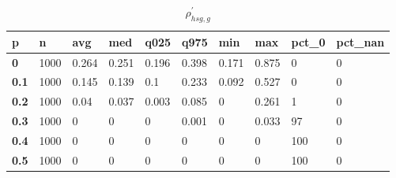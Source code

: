 \begin{table}[h]
 \centering 
\footnotesize
\caption{$\rho_{hsg,g}^\prime $}
\label{tab:alphahsgg}
\begin{tabular}[h]{|l|l|l|l|l|l|l|l|l|l|
    } \hline
\textbf{ p} & \textbf{ n} & \textbf{ avg} & \textbf{ med} & \textbf{ q025} & \textbf{ q975} & \textbf{ min} & \textbf{ max} & \textbf{ pct\_0} & \textbf{ pct\_nan}
    \\ \hline
  \textbf{  0} & 1000 & 0.264 & 0.251 & 0.196 & 0.398 & 0.171 & 0.875 &   0 & 0
    \\ \hline
  \textbf{0.1} & 1000 & 0.145 & 0.139 &   0.1 & 0.233 & 0.092 & 0.527 &   0 & 0
    \\ \hline
  \textbf{0.2} & 1000 &  0.04 & 0.037 & 0.003 & 0.085 &     0 & 0.261 &   1 & 0
    \\ \hline
  \textbf{0.3} & 1000 &     0 &     0 &     0 & 0.001 &     0 & 0.033 &  97 & 0
    \\ \hline
  \textbf{0.4} & 1000 &     0 &     0 &     0 &     0 &     0 &     0 & 100 & 0
    \\ \hline
  \textbf{0.5} & 1000 &     0 &     0 &     0 &     0 &     0 &     0 & 100 & 0
    \\ \hline
 \end{tabular}
 \end{table}
